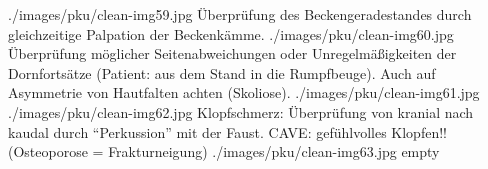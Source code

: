 \begin{PictureSeriesWide}{}{}
{./images/pku/clean-img59.jpg}
{Überprüfung des Beckengeradestandes durch gleichzeitige Palpation
der Beckenkämme.}
{./images/pku/clean-img60.jpg}
{Überprüfung möglicher Seitenabweichungen oder
Unregelmäßigkeiten der Dornfortsätze (Patient: aus dem Stand in
die Rumpfbeuge). Auch auf Asymmetrie von Hautfalten achten (Skoliose).}
{./images/pku/clean-img61.jpg}
{}
{}
{}
{./images/pku/clean-img62.jpg}
{Klopfschmerz: Überprüfung von kranial nach kaudal durch
\enquote{Perkussion} mit der Faust. CAVE:
gefühlvolles Klopfen!! (Osteoporose = Frakturneigung)}
{./images/pku/clean-img63.jpg}
{}
{empty}
{}
{}
{}
\end{PictureSeriesWide}




\clearpage
{}
{\mbox{}

% 
% 
% 
% 
% 
% 
% 

} 
{}
{}
{}
{}


